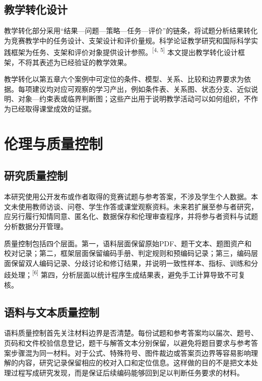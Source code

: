 \documentclass[
  12pt,
  a4paper]{ctexbook}
\begin{document}
\subsection{教学转化设计}\label{ux6559ux5b66ux8f6cux5316ux8bbeux8ba1}

教学转化部分采用``结果---问题---策略---任务---评价''的链条，将试题分析结果转化为竞赛教学中的任务设计、支架设计和评价量规。科学论证教学研究和国际科学实践框架为任务、支架和评价对象提供设计参照。\textsuperscript{[4, 5]}
本文提出教学转化设计框架，不将其表述为已经验证的教学效果。

教学转化以第五章六个案例中可定位的条件、模型、关系、比较和边界要求为依据。每项建议均对应可观察的学习产出，例如条件表、关系图、状态分支、近似说明、对象---约束表或临界判断图；这些产出用于说明教学活动可以如何组织，不作为已经取得课堂成效的证据。

\section{伦理与质量控制}\label{ux4f26ux7406ux4e0eux8d28ux91cfux63a7ux5236}

\subsection{研究质量控制}\label{ux7814ux7a76ux8d28ux91cfux63a7ux5236}

本研究使用公开发布或作者取得的竞赛试题与参考答案，不涉及学生个人数据。本文未使用教师访谈、问卷、学生作答或课堂观察资料。未来若扩展至参与者研究，应另行履行知情同意、匿名化、数据保存和伦理审查程序，并将参与者资料与试题分析数据分开管理。

质量控制包括四个层面。第一，语料层面保留原始PDF、题干文本、题图资产和校对记录；第二，框架层面保留编码手册、判定规则和预编码记录；第三，编码层面保留双人编码记录、分歧讨论和修订结果，并说明一致性样本、指标、训练和分歧处理；\textsuperscript{[6]}
第四，分析层面以统计程序生成结果表，避免手工计算导致不可复核。

\subsection{语料与文本质量控制}\label{ux8bedux6599ux4e0eux6587ux672cux8d28ux91cfux63a7ux5236}

语料质量控制首先关注材料边界是否清楚。每份试题和参考答案均以届次、题号、页码和文件校验信息登记，题干与解答文本分别保留，以避免将题目要求与参考答案步骤混为同一材料。对于公式、特殊符号、图件裁边或答案页边界等容易影响理解的内容，研究记录保留相应的校对入口和定位信息。这样做的目的不是把文本处理过程写成研究发现，而是保证后续编码能够回到足以判断任务要求的材料。
\end{document}
